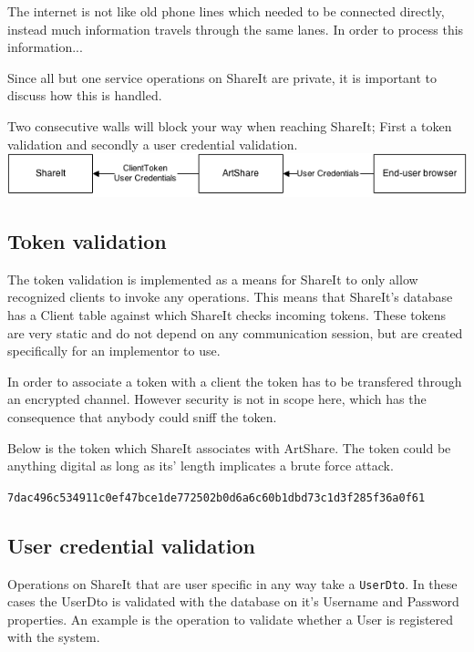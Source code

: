 \documentclass[../report.tex]{subfiles}
\begin{document}
\graphicspath{{img/}{../img/}}

The internet is not like old phone lines which needed to be connected directly, instead much information travels through the same lanes. In order to process this information...

Since all but one service operations on ShareIt are private, it is important to discuss how this is handled.

Two consecutive walls will block your way when reaching ShareIt; First a token validation and secondly a user credential validation. \\

\includegraphics[width=\linewidth]{./AccessControlDeployment.png}

\subsection{Token validation}

The token validation is implemented as a means for ShareIt to only allow recognized clients to invoke any operations. This means that ShareIt's database has a Client table against which ShareIt checks incoming tokens. These tokens are very static and do not depend on any communication session, but are created specifically for an implementor to use.

In order to associate a token with a client the token has to be transfered through an encrypted channel. However security is not in scope here, which has the consequence that anybody could sniff the token.

Below is the token which ShareIt associates with ArtShare. The token could be anything digital as long as its' length implicates a brute force attack.

\begin{center}
\texttt{7dac496c534911c0ef47bce1de772502b0d6a6c60b1dbd73c1d3f285f36a0f61}
\end{center}



\subsection{User credential validation}

Operations on ShareIt that are user specific in any way take a \texttt{UserDto}. In these cases the UserDto is validated with the database on it's Username and Password properties. An example is the operation to validate whether a User is registered with the system.
\end{document}
